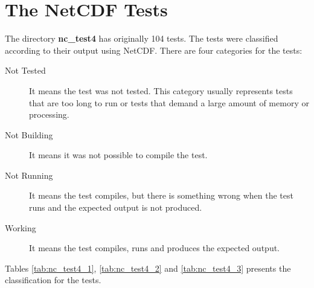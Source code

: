 \chapter{The NetCDF Tests}
\label{ch:nctests}

\tab
The directory \textbf{nc\_test4} has originally 104 tests. The tests were classified according to their output using NetCDF. There are four categories for the tests:

\begin{description}

\item[Not Tested] It means the test was not tested. This category usually represents tests that are too long to run or tests that demand a large amount of memory or processing.

\item[Not Building] It means it was not possible to compile the test.

\item[Not Running] It means the test compiles, but there is something wrong when the test runs and the expected output is not produced.

\item[Working] It means the test compiles, runs and produces the expected output.

\end{description}

Tables \ref{tab:nc_test4_1}, \ref{tab:nc_test4_2} and \ref{tab:nc_test4_3} presents the classification for the tests.
